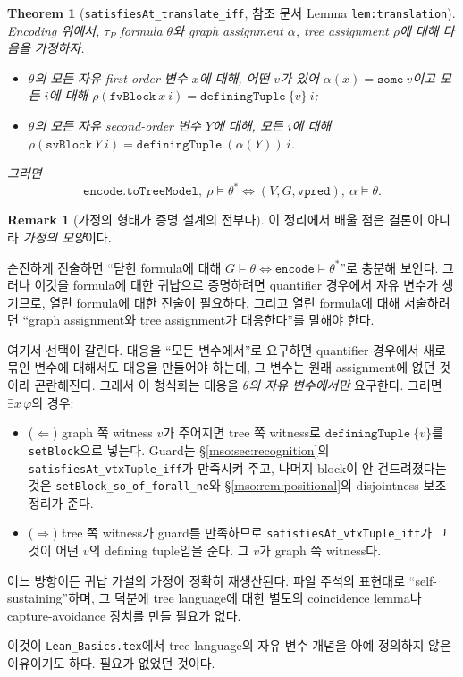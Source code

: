 \documentclass[11pt]{article}
\theoremstyle{definition}
\newtheorem{remark}[definition]{Remark}
\theoremstyle{plain}
\newtheorem{theorem}[definition]{Theorem}
\newcommand{\lean}[1]{\texttt{#1}}
\newcommand{\leanfile}[1]{\texttt{#1}}
\begin{document}
\begin{theorem}[\lean{satisfiesAt\_translate\_iff}, 참조 문서 Lemma \lean{lem:translation}]
\label{mso:thm:translatecorrect}
Encoding 위에서, $\tau_P$ formula $\theta$와 graph assignment $\alpha$,
tree assignment $\rho$에 대해 다음을 가정하자.
\begin{itemize}
  \item $\theta$의 모든 자유 first-order 변수 $x$에 대해, 어떤 $v$가 있어
    $\alpha(x) = \lean{some}\ v$이고 모든 $i$에 대해
    $\rho(\lean{fvBlock}\ x\ i) = \lean{definingTuple}\ \{v\}\ i$;
  \item $\theta$의 모든 자유 second-order 변수 $Y$에 대해, 모든 $i$에 대해
    $\rho(\lean{svBlock}\ Y\ i) = \lean{definingTuple}\ (\alpha(Y))\ i$.
\end{itemize}
그러면
\[
  \lean{encode}.\lean{toTreeModel},\ \rho \models \theta^\ast
  \iff
  (V, G, \lean{vpred}),\ \alpha \models \theta.
\]
\end{theorem}

\begin{remark}[가정의 형태가 증명 설계의 전부다]
\label{mso:rem:translationhyp}
이 정리에서 배울 점은 결론이 아니라 \emph{가정의 모양}이다.

순진하게 진술하면 ``닫힌 formula에 대해 $G \models \theta \iff
\lean{encode} \models \theta^\ast$''로 충분해 보인다. 그러나 이것을 formula에
대한 귀납으로 증명하려면 quantifier 경우에서 자유 변수가 생기므로, 열린
formula에 대한 진술이 필요하다. 그리고 열린 formula에 대해 서술하려면
``graph assignment와 tree assignment가 대응한다''를 말해야 한다.

여기서 선택이 갈린다. 대응을 ``모든 변수에서''로 요구하면 quantifier 경우에서
새로 묶인 변수에 대해서도 대응을 만들어야 하는데, 그 변수는 원래 assignment에
없던 것이라 곤란해진다. 그래서 이 형식화는 대응을 \emph{$\theta$의 자유
변수에서만} 요구한다. 그러면 $\exists x\,\varphi$의 경우:
\begin{itemize}
  \item ($\Leftarrow$) graph 쪽 witness $v$가 주어지면 tree 쪽 witness로
    $\lean{definingTuple}\ \{v\}$를 \lean{setBlock}으로 넣는다. Guard는
    \S\ref{mso:sec:recognition}의 \lean{satisfiesAt\_vtxTuple\_iff}가 만족시켜
    주고, 나머지 block이 안 건드려졌다는 것은
    \lean{setBlock\_so\_of\_forall\_ne}와 \S\ref{mso:rem:positional}의
    disjointness 보조정리가 준다.
  \item ($\Rightarrow$) tree 쪽 witness가 guard를 만족하므로
    \lean{satisfiesAt\_vtxTuple\_iff}가 그것이 어떤 $v$의 defining tuple임을
    준다. 그 $v$가 graph 쪽 witness다.
\end{itemize}
어느 방향이든 귀납 가설의 가정이 정확히 재생산된다. 파일 주석의 표현대로
``self-sustaining''하며, 그 덕분에 tree language에 대한 별도의 coincidence
lemma나 capture-avoidance 장치를 만들 필요가 없다.

이것이 \leanfile{Lean\_Basics.tex}에서 tree language의 자유 변수 개념을
아예 정의하지 않은 이유이기도 하다. 필요가 없었던 것이다.
\end{remark}
\end{document}
